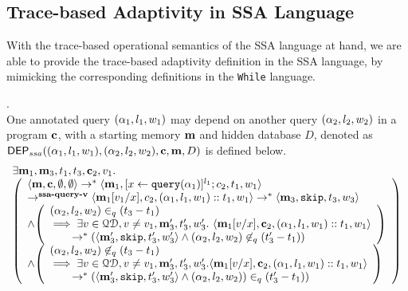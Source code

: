 \documentclass[a4paper,11pt]{article}
\begin{document}
\subsection{Trace-based Adaptivity in SSA Language}
With the trace-based operational semantics of the SSA language at hand, we are able to provide the trace-based adaptivity definition in the SSA language,
by mimicking the corresponding definitions in the {\tt While} language.
\begin{defn}
.
\\
{
One annotated query $({\alpha}_1, l_1, w_1)$ may depend on another query $({\alpha}_2,l_2, w_2)$ in a program $\boldsymbol{\mathbf{c}}$,
with a starting memory $\boldsymbol{\mathbf{m}}$ and  hidden database $D$, denoted as 
%
$\mathsf{DEP}_{ssa}({(\alpha_1, l_1, w_1)}, ({\alpha}_2, l_2, w_2), \boldsymbol{\mathbf{c}}, \boldsymbol{\mathbf{m}}, D)$ is defined below. 
%
%
\[
\begin{array}{l}
\exists \ssa{m}_1,\ssa{m}_3,t_1,t_3,\ssa{c}_2,v_1.\\
  \left (\begin{array}{l}   
\config{\ssa{m}, \ssa{c}, \emptyset ,\emptyset} \rightarrow^{*} 
\config{\ssa{m}_1, [\assign{x}{\query({\qval}_1)}]^{l_1} ; c_2,
  t_1, w_1} 
\\ 
\rightarrow^{\textbf{{ssa-query-v}}} 
\config{\ssa{m}_1[v_1/x], c_2,
({\qval}_1,l_1, w_1)::t_1, w_1} \rightarrow^{*} \config{\ssa{m}_3, \eskip,
t_3,w_3}
 \\ \land
  \left( 
  \begin{array}{l}
  ({\qval}_2,l_2,w_2) \in_{q} (t_3-t_1) 
  \\
  \implies 
  \exists v \in \qdom, v \neq v_1, \ssa{m}_3', t_3', w_3'. ~  
  \config{\ssa{m}_1[v/x], {\ssa{c}_2}, ({\qval}_1,l_1, w_1)::t_1, w_1} 
  \\ 
  \quad \quad 
  \rightarrow^{*}
  (\config{\ssa{m}_3', \eskip, t_3', w_3'} 
  \land 
  ({\qval}_2,l_2,w_2) \not \in_{q} (t_3'-t_1))
\end{array} \right )
\\\land
\left( 
  \begin{array}{l}
	({\qval}_2,l_2,w_2) \not\in_{q} (t_3-t_1)
  	\\
  	\implies 
	\exists v \in \qdom, v \neq v_1, \ssa{m}_3', t_3', w_3'. 
	\config{\ssa{m}_1[v/x], {\ssa{c}_2}, ({\qval}_1,l_1,w_1)::t_1, w_1}
	\\ 
	\quad \quad 
	\rightarrow^{*} 
	(\config{\ssa{m}_3', \eskip, t_3', w_3'} 
	\land 
	({\qval}_2,l_2,w_2))  \in_{q} (t_3'-t_1))
\end{array} \right )
\end{array} \right )
\end{array}
\]
}
\end{defn}
\end{document}
